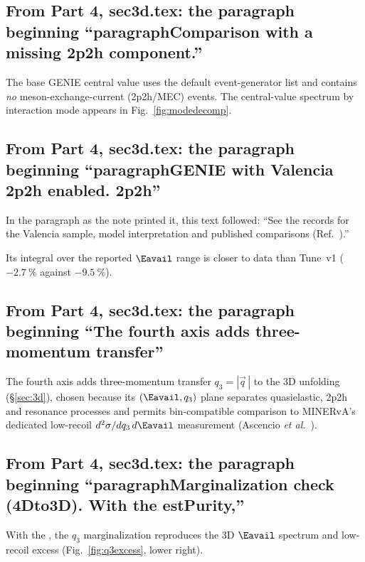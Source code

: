 \subsection{From Part 4, sec3d.tex: the paragraph beginning ``paragraphComparison with a missing 2p2h component.''}
The base GENIE central value uses the default event-generator list and contains \emph{no} meson-exchange-current (2p2h/MEC) events. The central-value spectrum by interaction mode appears in Fig.~\ref{fig:modedecomp}.

\subsection{From Part 4, sec3d.tex: the paragraph beginning ``paragraphGENIE with Valencia 2p2h enabled. 2p2h''}
In the paragraph as the note printed it, this text followed: ``See the records for the Valencia sample, model interpretation and published comparisons (Ref.~\cite{NoteRecords2026}).''\par
Its integral over the reported $\Eavail$ range is closer to data than Tune~v1 ($-\SI{2.7}{\percent}$ against $-\SI{9.5}{\percent}$).

\subsection{From Part 4, sec3d.tex: the paragraph beginning ``The fourth axis adds three-momentum transfer''}
The fourth axis adds three-momentum transfer $q_{3}=|\vec{q}\,|$ to the 3D unfolding (\S\ref{sec:3d}), chosen because its $(\Eavail,q_{3})$ plane separates quasielastic, 2p2h and resonance processes and permits bin-compatible comparison to MINERvA's dedicated low-recoil $d^{2}\sigma/dq_{3}\,d\Eavail$ measurement (Ascencio \emph{et al.}~\cite{MINERvA:2022incl}).

\subsection{From Part 4, sec3d.tex: the paragraph beginning ``paragraphMarginalization check (4Dto3D). With the estPurity,''}
With the \estPurity{}, the $q_{3}$ marginalization reproduces the 3D $\Eavail$ spectrum and low-recoil excess (Fig.~\ref{fig:q3excess}, lower right).

